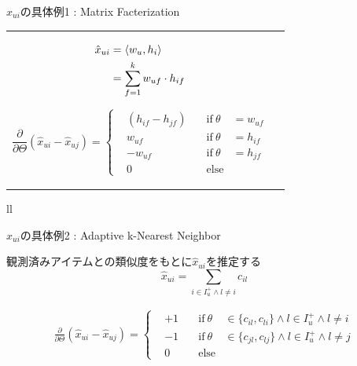\documentclass[aspectratio=43, dvipdfmx, 11pt]{beamer} %
\begin{document}
\begin{frame}{$x_{ui}$の具体例1 : Matrix Facterization}
\begin{tabular}{ll}
   \begin{minipage}{0.3\hsize}
        \begin{flushleft}
        \begin{equation*}
            \begin{aligned}
                \hat{x}_{ui} &= \braket{w_u,h_i}\\
                            &= \sum_{f=1}^k w_{uf}\cdot h_{if}                    
            \end{aligned}
        \end{equation*}
         \end{flushleft}
    \end{minipage}
    \begin{minipage}{0.7\hsize}
        \begin{flushleft}
            \begin{equation*}
                \frac{\partial}{\partial \Theta}(\hat{x}_{ui}-\hat{x}_{uj})=
                \left\{
                \begin{aligned}
                &(h_{if}-h_{jf})\quad &\text{if}\ \theta&=w_{uf}\\
                &w_{uf}&\text{if}\ \theta&=h_{if}\\
                &-w_{uf}&\text{if}\ \theta&=h_{jf}\\
                &0 &\text{else}                \end{aligned}
                \right.
            \end{equation*}
        \end{flushleft}
    \end{minipage}
\end{tabular}{ll}
\end{frame}

\begin{frame}{$x_{ui}$の具体例2 : Adaptive k-Nearest Neighbor}
    
    観測済みアイテムとの類似度をもとに$\hat{x}_{ui}$を推定する
    \LARGE \[\hat{x}_{ui}=\sum_{i \in I^+_u \land l \neq i}c_{il}\]

    \large    \begin{equation*}
            \begin{aligned}
                \frac{\partial}{\partial \Theta}(\hat{x}_{ui}-\hat{x}_{uj})=
                \left\{
                \begin{aligned}
                &+1 \quad &\text{if}\ \theta&\in \{c_{il},c_{li}\} \land l\in I^+_u \land l \neq i\\
                &-1&\text{if}\ \theta&\in \{c_{jl},c_{lj}\} \land l\in I^+_u \land l \neq j\\
                &0 &\text{else}
            \end{aligned}
                \right.
    \end{aligned}
            \end{equation*}
    

\end{frame}
\end{document}
